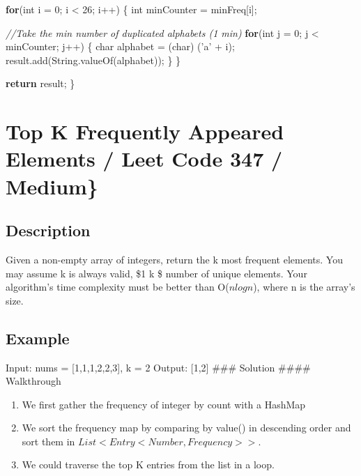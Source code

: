 \documentclass[]{book}
\newenvironment{Shaded}{\begin{snugshade}}{\end{snugshade}}
\newcommand{\BuiltInTok}[1]{#1}
\newcommand{\CharTok}[1]{\textcolor[rgb]{0.31,0.60,0.02}{#1}}
\newcommand{\CommentTok}[1]{\textcolor[rgb]{0.56,0.35,0.01}{\textit{#1}}}
\newcommand{\DataTypeTok}[1]{\textcolor[rgb]{0.13,0.29,0.53}{#1}}
\newcommand{\DecValTok}[1]{\textcolor[rgb]{0.00,0.00,0.81}{#1}}
\newcommand{\FunctionTok}[1]{\textcolor[rgb]{0.00,0.00,0.00}{#1}}
\newcommand{\KeywordTok}[1]{\textcolor[rgb]{0.13,0.29,0.53}{\textbf{#1}}}
\newcommand{\NormalTok}[1]{#1}
\begin{document}
\begin{Shaded}
\begin{Highlighting}[]
    \KeywordTok{for}\NormalTok{(}\DataTypeTok{int}\NormalTok{ i = }\DecValTok{0}\NormalTok{; i < }\DecValTok{26}\NormalTok{; i++) \{}
        \DataTypeTok{int}\NormalTok{ minCounter = minFreq[i];}

        \CommentTok{//Take the min number of duplicated alphabets (1 min)}
        \KeywordTok{for}\NormalTok{(}\DataTypeTok{int}\NormalTok{ j = }\DecValTok{0}\NormalTok{; j < minCounter; j++) \{}
            \DataTypeTok{char}\NormalTok{ alphabet = (}\DataTypeTok{char}\NormalTok{) (}\CharTok{'a'}\NormalTok{ + i);}
\NormalTok{            result.}\FunctionTok{add}\NormalTok{(}\BuiltInTok{String}\NormalTok{.}\FunctionTok{valueOf}\NormalTok{(alphabet));}
\NormalTok{        \}}
\NormalTok{    \}}

    \KeywordTok{return}\NormalTok{ result;}
\NormalTok{\}}
\end{Highlighting}
\end{Shaded}

\hypertarget{top-k-frequently-appeared-elements-leet-code-347-medium}{%
\section{Top K Frequently Appeared Elements / Leet Code 347 / Medium\}}\label{top-k-frequently-appeared-elements-leet-code-347-medium}}

\hypertarget{description-23}{%
\subsection{Description}\label{description-23}}

Given a non-empty array of integers, return the k most frequent elements. You may assume k is always valid,
\$1 \le k \le \$ number of unique elements. Your algorithm's time complexity must be better than O(\(n log n\)), where n
is the array's size.

\hypertarget{example-22}{%
\subsection{Example}\label{example-22}}

Input: nums = {[}1,1,1,2,2,3{]}, k = 2 Output: {[}1,2{]}
\#\#\# Solution
\#\#\#\# Walkthrough

\begin{enumerate}
    \item We first gather the frequency of integer by count with a HashMap
    \item We sort the frequency map by comparing by value() in descending order and sort them in
    $List<Entry<Number, Frequency>>$.
    \item We could traverse the top K entries from the list in a loop.
\end{enumerate}
\end{document}
